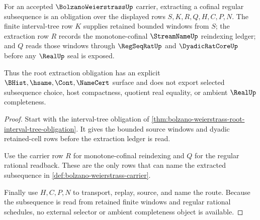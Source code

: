 \begin{theorem}
\label{thm:bolzano-weierstrass-root-subsequence-extraction-obligation}
For an accepted $\BolzanoWeierstrassUp$ carrier, extracting a cofinal regular subsequence is an obligation over the displayed rows $S,K,R,Q,H,C,P,N$. The finite interval-tree row $K$ supplies retained bounded windows from $S$; the extraction row $R$ records the monotone-cofinal $\StreamNameUp$ reindexing ledger; and $Q$ reads those windows through $\RegSeqRatUp$ and $\DyadicRatCoreUp$ before any $\RealUp$ seal is exposed.

Thus the root extraction obligation has an explicit $\BHist,\hsame,\Cont,\NameCert$ surface and does not export selected subsequence choice, host compactness, quotient real equality, or ambient $\RealUp$ completeness.
\end{theorem}
\begin{proof}
Start with the interval-tree obligation of \autoref{thm:bolzano-weierstrass-root-interval-tree-obligation}. It gives the bounded source windows and dyadic retained-cell rows before the extraction ledger is read.

Use the carrier row $R$ for monotone-cofinal reindexing and $Q$ for the regular rational readback. These are the only rows that can name the extracted subsequence in \autoref{def:bolzano-weierstrass-carrier}.

Finally use $H,C,P,N$ to transport, replay, source, and name the route. Because the subsequence is read from retained finite windows and regular rational schedules, no external selector or ambient completeness object is available.
\end{proof}

